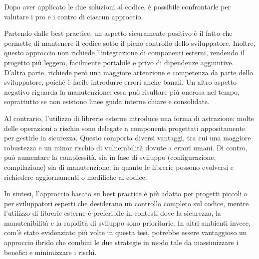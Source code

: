 Dopo aver applicato le due soluzioni al codice, è possibile confrontarle per valutare
i pro e i contro di ciascun approccio.

Partendo dalle best practice, un aspetto sicuramente positivo è il fatto che
permette di mantenere il codice sotto il pieno controllo dello sviluppatore. Inoltre,
questo approccio non richiede l'integrazione di componenti esterni, rendendo il progetto
più leggero, facilmente portabile e privo di dipendenze aggiuntive. D'altra parte,
richiede però una maggiore attenzione e competenza da parte dello sviluppatore, poiché
è facile introdurre errori anche banali. Un altro aspetto negativo riguarda la
manutenzione: essa può risultare più onerosa nel tempo, soprattutto se non
esistono linee guida interne chiare e consolidate.

Al contrario, l'utilizzo di librerie esterne introduce una forma di astrazione:
molte delle operazioni a rischio sono delegate a componenti progettati
appositamente per gestirle in sicurezza. Questo comporta diversi vantaggi, tra
cui una maggiore robustezza e un minor rischio di vulnerabilità dovute a errori
umani. Di contro, può aumentare la complessità, sia in fase di sviluppo (configurazione,
compilazione) sia di manutenzione, in quanto le librerie possono evolversi e richiedere
aggiornamenti o modifiche al codice.

In sintesi, l'approccio basato su best practice è più adatto per progetti
piccoli o per sviluppatori esperti che desiderano un controllo completo sul
codice, mentre l'utilizzo di librerie esterne è preferibile in contesti dove la sicurezza,
la manutenibilità e la rapidità di sviluppo sono prioritarie. In altri ambienti invece,
com'è stato evidenziato più volte in questa tesi, potrebbe essere vantaggioso un
approccio ibrido che combini le due strategie in modo tale da massimizzare i benefici
e minimizzare i rischi.